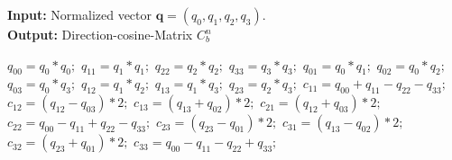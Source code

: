 \documentclass[journal]{IEEEtran}
\begin{document}
\begin{algorithm}[h]

\caption{Efficient direction cosine matrix computation}
\label{alg:alg2}
 \hspace*{\algorithmicindent} \textbf{Input:} Normalized vector $\boldsymbol{q}=(q_0,q_1,q_2,q_3)$.  \\
 \hspace*{\algorithmicindent} \textbf{Output:} Direction-cosine-Matrix $C_b^n$
\begin{algorithmic}[1]
\State $q_{00} = q_0 * q_0;$
\State $q_{11} = q_1 * q_1;$
\State $q_{22} = q_2 * q_2;$
\State $q_{33} = q_3 * q_3;$
\State $q_{01} = q_0 * q_1;$
\State $q_{02} = q_0 * q_2;$
\State $q_{03} = q_0 * q_3;$
\State $q_{12} = q_1 * q_2;$
\State $q_{13} = q_1 * q_3;$
\State $q_{23} = q_2 * q_3;$
\State $c_{11} = q_{00} + q_{11} - q_{22} - q_{33}; $
\State $c_{12} = (q_{12} - q_{03}) * 2; $
\State $c_{13} = (q_{13} + q_{02}) * 2;$
\State $c_{21} = (q_{12} + q_{03}) * 2;$
\State $c_{22} = q_{00} - q_{11} + q_{22} - q_{33};$
\State $c_{23} = (q_{23} - q_{01}) * 2;$
\State $c_{31} = (q_{13} - q_{02}) * 2;$
\State $c_{32} = (q_{23} + q_{01}) * 2;$
\State $c_{33} = q_{00} - q_{11} - q_{22} + q_{33};$
\end{algorithmic}
\end{algorithm}


%
\end{document}
